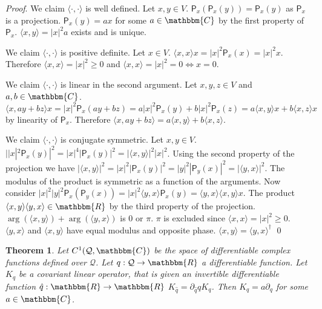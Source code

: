 \documentclass[aps,pra,10pt,twocolumn,floatfix,nofootinbib]{revtex4-1}
\numberwithin{equation}{section}
\newtheorem{thrm}[equation]{Theorem}
\theoremstyle{definition}
\renewenvironment{proof}{\emph{Proof}.}{\qed}
\begin{document}
\begin{proof}
	We claim $\langle \cdot , \cdot \rangle$ is well defined. Let $x, y \in V$. $\mathsf{P}_x (\mathsf{P}_x (y)) =\mathsf{P}_x(y)$ as $\mathsf{P}_x$ is a projection. $\mathsf{P}_x(y) = a x $ for some $a \in \mathbbm{C}$ by the first property of $\mathsf{P}_x$. $\langle x , y \rangle = |x|^2 a$ exists and is unique. 
	
	We claim $\langle \cdot , \cdot \rangle$ is positive definite. Let $x \in V$. $\langle x , x \rangle x = |x|^2 \mathsf{P}_x(x) = |x|^2 x $. Therefore $\langle x , x \rangle = |x|^2 \ge 0$ and $\langle x , x \rangle = |x|^2 = 0 \Leftrightarrow x = 0$.
	
	We claim $\langle \cdot , \cdot \rangle$ is linear in the second argument. Let $x,y,z \in V$ and $a,b \in \mathbbm{C}$. $\langle x , a y + b z \rangle x = |x|^2 \mathsf{P}_x(a y + b z)=a  |x|^2 \mathsf{P}_x(y) + b  |x|^2 \mathsf{P}_x(z) = a \langle x , y \rangle x + b \langle x, z \rangle x$ by linearity of $\mathsf{P}_x$. Therefore $\langle x , a y + b z \rangle = a \langle x , y \rangle + b \langle x, z \rangle$.
	
	We claim $\langle \cdot , \cdot \rangle$ is conjugate symmetric. Let $x,y \in V$. $ | |x|^2\mathsf{P}_x(y)|^2 = |x|^4|\mathsf{P}_x(y)|^2 = |\langle x , y \rangle|^2 |x|^2$. Using the second property of the projection we have $|\langle x , y \rangle|^2 = |x|^2|\mathsf{P}_x(y)|^2 =  |y|^2|\mathsf{P}_y(x)|^2 = |\langle y , x \rangle|^2$. The modulus of the product is symmetric as a function of the arguments. Now consider $|x|^2|y|^2\mathsf{P}_x(\mathsf{P}_y(x)) = |x|^2 \langle y , x \rangle \mathsf{P}_x(y) = \langle y , x \rangle \langle x , y \rangle x$. The product $\langle x , y \rangle \langle y , x \rangle \in \mathbbm{R}$ by the third property of the projection. $\arg(\langle x , y \rangle) + \arg(\langle y , x \rangle)$ is $0$ or $\pi$. $\pi$ is excluded since $\langle x , x \rangle = |x|^2 \ge 0$. $\langle y , x \rangle$ and $\langle x , y \rangle$ have equal modulus and opposite phase. $\langle x , y \rangle = \langle y , x \rangle^\dagger$
\end{proof}

\begin{thrm}\label{thrm:covariant_operator}
	Let $C^1(\mathcal{Q}, \mathbbm{C})$ be the space of differentiable complex functions defined over $\mathcal{Q}$. Let $q : \mathcal{Q} \rightarrow \mathbbm{R}$ a differentiable function. Let $K_q$ be a covariant linear operator, that is given an invertible differentiable function $\hat{q} : \mathbbm{R} \rightarrow \mathbbm{R}$ $K_{\hat{q}} = \partial_{\hat{q}} q K_{q}$. Then $K_q = a \partial_q$ for some $a \in \mathbbm{C}$.
\end{thrm}
\end{document}
